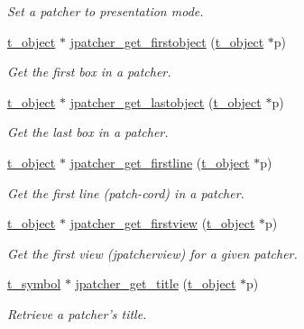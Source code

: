 \begin{DoxyCompactItemize}
\begin{DoxyCompactList}\small\item\em Set a patcher to presentation mode. \item\end{DoxyCompactList}\item 
\hyperlink{structt__object}{t\_\-object} $\ast$ \hyperlink{group__jpatcher_gafd77f63d504807973a4ce400c304b174}{jpatcher\_\-get\_\-firstobject} (\hyperlink{structt__object}{t\_\-object} $\ast$p)
\begin{DoxyCompactList}\small\item\em Get the first box in a patcher. \item\end{DoxyCompactList}\item 
\hyperlink{structt__object}{t\_\-object} $\ast$ \hyperlink{group__jpatcher_gaffb5e8d5224f7aa04cdbee76a041bab7}{jpatcher\_\-get\_\-lastobject} (\hyperlink{structt__object}{t\_\-object} $\ast$p)
\begin{DoxyCompactList}\small\item\em Get the last box in a patcher. \item\end{DoxyCompactList}\item 
\hyperlink{structt__object}{t\_\-object} $\ast$ \hyperlink{group__jpatcher_ga5d110fdbf8797e9d0edfa1e47afdc691}{jpatcher\_\-get\_\-firstline} (\hyperlink{structt__object}{t\_\-object} $\ast$p)
\begin{DoxyCompactList}\small\item\em Get the first line (patch-\/cord) in a patcher. \item\end{DoxyCompactList}\item 
\hyperlink{structt__object}{t\_\-object} $\ast$ \hyperlink{group__jpatcher_gaccc0cfeb70fbeecbd322de7e8b9bac98}{jpatcher\_\-get\_\-firstview} (\hyperlink{structt__object}{t\_\-object} $\ast$p)
\begin{DoxyCompactList}\small\item\em Get the first view (jpatcherview) for a given patcher. \item\end{DoxyCompactList}\item 
\hyperlink{structt__symbol}{t\_\-symbol} $\ast$ \hyperlink{group__jpatcher_gae9067670d2885c808fa2db1e22a327d8}{jpatcher\_\-get\_\-title} (\hyperlink{structt__object}{t\_\-object} $\ast$p)
\begin{DoxyCompactList}\small\item\em Retrieve a patcher's title. \item\end{DoxyCompactList}\item 

\end{DoxyCompactItemize}

